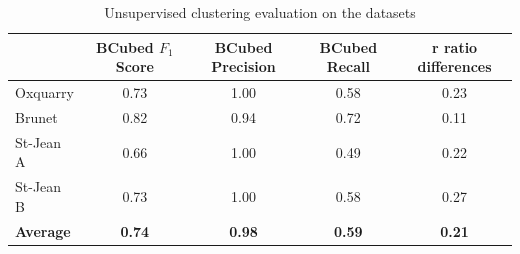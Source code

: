 \begin{table}
  \centering
  \caption{Unsupervised clustering evaluation on the datasets}
  \label{tab:unsupervised_clustering}
    \begin{tabular}{l c c c c}
      \toprule
      &
      BCubed $F_1$ Score &
      BCubed Precision &
      BCubed Recall &
      r ratio differences \\
      \midrule
      Oxquarry         & 0.73 & 1.00 & 0.58 & 0.23\\
      Brunet           & 0.82 & 0.94 & 0.72 & 0.11\\
      St-Jean A        & 0.66 & 1.00 & 0.49 & 0.22\\
      St-Jean B        & 0.73 & 1.00 & 0.58 & 0.27\\
      \textbf{Average} &
      \textbf{0.74} &
      \textbf{0.98} &
      \textbf{0.59} &
      \textbf{0.21} \\
      \bottomrule
    \end{tabular}
\end{table}

